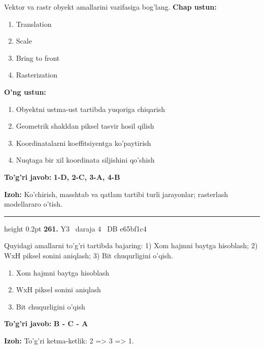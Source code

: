 \documentclass[10pt,a4paper,oneside]{article}
\begin{document}
Vektor va rastr obyekt amallarini vazifasiga bog'lang.
\textbf{\footnotesize Chap ustun:}
\begin{enumerate}[label=\arabic*),leftmargin=9mm]
\item Translation
\item Scale
\item Bring to front
\item Rasterization
\end{enumerate}
\textbf{\footnotesize O'ng ustun:}
\begin{enumerate}[label=\Alph*),leftmargin=9mm]
\item Obyektni ustma-ust tartibda yuqoriga chiqarish
\item Geometrik shakldan piksel tasvir hosil qilish
\item Koordinatalarni koeffitsiyentga ko'paytirish
\item Nuqtaga bir xil koordinata siljishini qo'shish
\end{enumerate}
\begin{tcolorbox}[enhanced,breakable,colback=teal!4,colframe=teal!45!black,boxrule=0.45pt,arc=1.2mm,left=2.8mm,right=2.8mm,top=2mm,bottom=2mm,before skip=2mm,after skip=2mm]
\textbf{\color{teal}To'g'ri javob:} \textbf{1-D, 2-C, 3-A, 4-B}
\par\smallskip
\textbf{Izoh:} Ko'chirish, masshtab va qatlam tartibi turli jarayonlar; rasterlash modellararo o'tish.
\end{tcolorbox}
\vspace{2mm}\hrule height 0.2pt \vspace{4mm}
\hypertarget{q261}{\textbf{\color{ink}261.}}  {\color{muted}\scriptsize Y3 \textbullet\ daraja 4 \textbullet\ DB e65bf1c4}
\par
Quyidagi amallarni to'g'ri tartibda bajaring: 1) Xom hajmni baytga hisoblash; 2) WxH piksel sonini aniqlash; 3) Bit chuqurligini o'qish.
\begin{enumerate}[label=\Alph*),leftmargin=9mm]
\item Xom hajmni baytga hisoblash
\item WxH piksel sonini aniqlash
\item Bit chuqurligini o'qish
\end{enumerate}
\begin{tcolorbox}[enhanced,breakable,colback=teal!4,colframe=teal!45!black,boxrule=0.45pt,arc=1.2mm,left=2.8mm,right=2.8mm,top=2mm,bottom=2mm,before skip=2mm,after skip=2mm]
\textbf{\color{teal}To'g'ri javob:} \textbf{B - C - A}
\par\smallskip
\textbf{Izoh:} To'g'ri ketma-ketlik: 2 =\textgreater{} 3 =\textgreater{} 1.
\end{tcolorbox}
\end{document}
